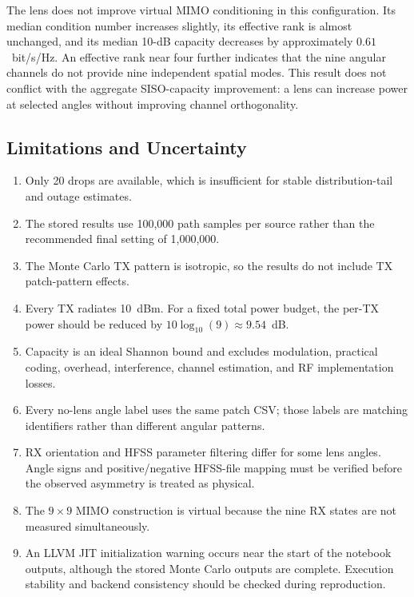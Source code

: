 \documentclass[10pt]{article}
\begin{document}
The lens does not improve virtual MIMO conditioning in this configuration.
Its median condition number increases slightly, its effective rank is almost
unchanged, and its median 10-dB capacity decreases by approximately
$0.61$~bit/s/Hz. An effective rank near four further indicates that the nine
angular channels do not provide nine independent spatial modes. This result
does not conflict with the aggregate SISO-capacity improvement: a lens can
increase power at selected angles without improving channel orthogonality.

\subsection{Limitations and Uncertainty}

\begin{enumerate}
    \item Only 20 drops are available, which is insufficient for stable
    distribution-tail and outage estimates.
    \item The stored results use 100,000 path samples per source rather than
    the recommended final setting of 1,000,000.
    \item The Monte Carlo TX pattern is isotropic, so the results do not
    include TX patch-pattern effects.
    \item Every TX radiates 10~dBm. For a fixed total power budget, the
    per-TX power should be reduced by
    $10\log_{10}(9)\approx9.54$~dB.
    \item Capacity is an ideal Shannon bound and excludes modulation,
    practical coding, overhead, interference, channel estimation, and RF
    implementation losses.
    \item Every no-lens angle label uses the same patch CSV; those labels are
    matching identifiers rather than different angular patterns.
    \item RX orientation and HFSS parameter filtering differ for some lens
    angles. Angle signs and positive/negative HFSS-file mapping must be
    verified before the observed asymmetry is treated as physical.
    \item The $9\times9$ MIMO construction is virtual because the nine RX
    states are not measured simultaneously.
    \item An LLVM JIT initialization warning occurs near the start of the
    notebook outputs, although the stored Monte Carlo outputs are complete.
    Execution stability and backend consistency should be checked during
    reproduction.
\end{enumerate}
\end{document}
